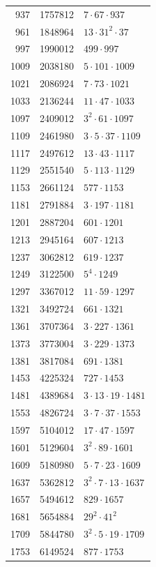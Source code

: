 \documentclass[11pt]{article}
\begin{document}
{\begin{longtable}{r r l}
937 & 1757812 & \(7\cdot67\cdot937\) \\
961 & 1848964 & \(13\cdot31^{2}\cdot37\) \\
997 & 1990012 & \(499\cdot997\) \\
1009 & 2038180 & \(5\cdot101\cdot1009\) \\
1021 & 2086924 & \(7\cdot73\cdot1021\) \\
1033 & 2136244 & \(11\cdot47\cdot1033\) \\
1097 & 2409012 & \(3^{2}\cdot61\cdot1097\) \\
1109 & 2461980 & \(3\cdot5\cdot37\cdot1109\) \\
1117 & 2497612 & \(13\cdot43\cdot1117\) \\
1129 & 2551540 & \(5\cdot113\cdot1129\) \\
1153 & 2661124 & \(577\cdot1153\) \\
1181 & 2791884 & \(3\cdot197\cdot1181\) \\
1201 & 2887204 & \(601\cdot1201\) \\
1213 & 2945164 & \(607\cdot1213\) \\
1237 & 3062812 & \(619\cdot1237\) \\
1249 & 3122500 & \(5^{4}\cdot1249\) \\
1297 & 3367012 & \(11\cdot59\cdot1297\) \\
1321 & 3492724 & \(661\cdot1321\) \\
1361 & 3707364 & \(3\cdot227\cdot1361\) \\
1373 & 3773004 & \(3\cdot229\cdot1373\) \\
1381 & 3817084 & \(691\cdot1381\) \\
1453 & 4225324 & \(727\cdot1453\) \\
1481 & 4389684 & \(3\cdot13\cdot19\cdot1481\) \\
1553 & 4826724 & \(3\cdot7\cdot37\cdot1553\) \\
1597 & 5104012 & \(17\cdot47\cdot1597\) \\
1601 & 5129604 & \(3^{2}\cdot89\cdot1601\) \\
1609 & 5180980 & \(5\cdot7\cdot23\cdot1609\) \\
1637 & 5362812 & \(3^{2}\cdot7\cdot13\cdot1637\) \\
1657 & 5494612 & \(829\cdot1657\) \\
1681 & 5654884 & \(29^{2}\cdot41^{2}\) \\
1709 & 5844780 & \(3^{2}\cdot5\cdot19\cdot1709\) \\
1753 & 6149524 & \(877\cdot1753\) \\

\end{longtable}}
\end{document}
